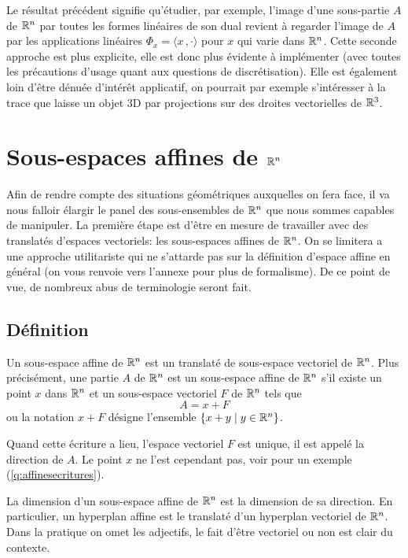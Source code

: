 \documentclass[11pt, a4paper]{article}
\begin{document}
Le résultat précédent signifie qu'étudier, par exemple, l'image d'une
sous-partie $A$ de $\mathbb{R}^n$ par toutes les formes linéaires de
son dual revient à regarder l'image de $A$ par les applications
linéaires $\Phi_x = \langle x\, , \cdot\rangle$ pour $x$ qui varie
dans $\mathbb{R}^n$. Cette seconde approche est plus explicite, elle
est donc plus évidente à implémenter (avec toutes les précautions
d'usage quant aux questions de discrétisation). Elle est également
loin d'être dénuée d'intérêt applicatif, on pourrait par exemple
s'intéresser à la trace que laisse un objet 3D par projections sur des
droites vectorielles de $\mathbb{R}^3$.
\section{Sous-espaces affines de $\mathbb{R}^n$}

Afin de rendre compte des situations géométriques auxquelles on fera
face, il va nous falloir élargir le panel des sous-ensembles de $\mathbb{R}^n$
que nous sommes capables de manipuler. La première étape est d'être en
mesure de travailler avec des translatés d'espaces vectoriels: les
sous-espaces affines de $\mathbb{R}^n$. On se limitera a une approche
utilitariste qui ne s'attarde pas sur la définition d'espace affine en
général (on vous renvoie vers l'annexe pour plus de formalisme). De ce
point de vue, de nombreux abus de terminologie seront fait.

\subsection{Définition}

\begin{defn}
  Un sous-espace affine de $\mathbb{R}^n$ est un translaté de sous-espace
  vectoriel de $\mathbb{R}^n$. Plus précisément, une partie $A$ de $\mathbb{R}^n$ est
  un sous-espace affine de $\mathbb{R}^n$ s'il existe un point $x$ dans $\mathbb{R}^n$
  et un sous-espace vectoriel $F$ de $\mathbb{R}^n$ tels que
\[
 A = x + F
\]
ou la notation $x + F$ désigne l'ensemble $\{x+y \mid y \in \mathbb{R}^n\}$.

Quand cette écriture a lieu, l'espace vectoriel $F$ est unique, il est
appelé la direction de $A$. Le point $x$ ne l'est cependant pas, voir
pour un exemple (\ref{q:affinesecritures}).
\end{defn}
La dimension d'un sous-espace affine de $\mathbb{R}^n$ est la
dimension de sa direction. En particulier, un hyperplan affine est le
translaté d'un hyperplan vectoriel de $\mathbb{R}^n$. Dans la pratique
on omet les adjectifs, le fait d'être vectoriel ou non est clair du
contexte.
\end{document}

